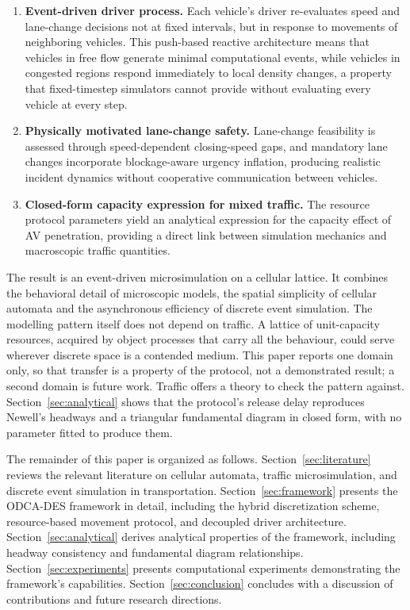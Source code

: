 \documentclass[review,number]{elsarticle}
\begin{document}
\begin{enumerate}
    \item \textbf{Event-driven driver process.} Each vehicle's driver re-evaluates speed and lane-change decisions not at fixed intervals, but in response to movements of neighboring vehicles. This push-based reactive architecture means that vehicles in free flow generate minimal computational events, while vehicles in congested regions respond immediately to local density changes, a property that fixed-timestep simulators cannot provide without evaluating every vehicle at every step.

    \item \textbf{Physically motivated lane-change safety.} Lane-change feasibility is assessed through speed-dependent closing-speed gaps, and mandatory lane changes incorporate blockage-aware urgency inflation, producing realistic incident dynamics without cooperative communication between vehicles.

    \item \textbf{Closed-form capacity expression for mixed traffic.} The resource protocol parameters yield an analytical expression for the capacity effect of AV penetration, providing a direct link between simulation mechanics and macroscopic traffic quantities.
\end{enumerate}

The result is an event-driven microsimulation on a cellular lattice. It combines the behavioral detail of microscopic models, the spatial simplicity of cellular automata and the asynchronous efficiency of discrete event simulation. The modelling pattern itself does not depend on traffic. A lattice of unit-capacity resources, acquired by object processes that carry all the behaviour, could serve wherever discrete space is a contended medium. This paper reports one domain only, so that transfer is a property of the protocol, not a demonstrated result; a second domain is future work. Traffic offers a theory to check the pattern against. Section~\ref{sec:analytical} shows that the protocol's release delay reproduces Newell's headways and a triangular fundamental diagram in closed form, with no parameter fitted to produce them.

The remainder of this paper is organized as follows. Section~\ref{sec:literature} reviews the relevant literature on cellular automata, traffic microsimulation, and discrete event simulation in transportation. Section~\ref{sec:framework} presents the ODCA-DES framework in detail, including the hybrid discretization scheme, resource-based movement protocol, and decoupled driver architecture. Section~\ref{sec:analytical} derives analytical properties of the framework, including headway consistency and fundamental diagram relationships. Section~\ref{sec:experiments} presents computational experiments demonstrating the framework's capabilities. Section~\ref{sec:conclusion} concludes with a discussion of contributions and future research directions.
\end{document}
